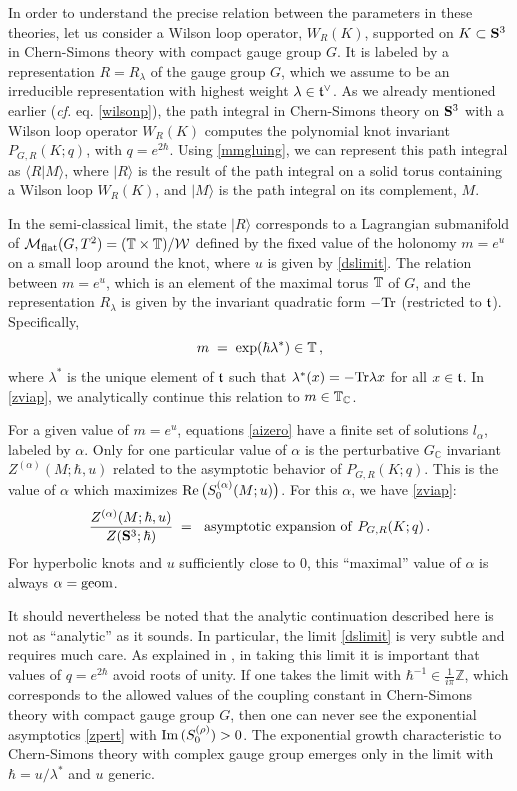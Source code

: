 \documentclass[hyper]{JHEP3}
\renewcommand{\Im}{{\rm Im}\,}
\renewcommand{\Re}{{\rm Re}\,}
\def\Tr{{\rm Tr}}
\def\CW {{\cal W}}
\def\TT{{\Bbb{T}}}
\newcommand{\C}{{\mathbb{C}}}
\newcommand{\Z}{{\mathbb{Z}}}
\newcommand{\M}{{{\cal M}}_{{\rm flat}}}
\newcommand\be{\begin{equation}}
\newcommand\ee{\end{equation}}
\def\={\;=\;}
\begin{document}
In order to understand the precise relation between the parameters in these theories,
let us consider a Wilson loop operator, $W_R (K)$,
supported on $K \subset {\bf S}^3$ in Chern-Simons theory with compact gauge group $G$.
It is labeled by a representation $R = R_{\lambda}$ of the gauge group $G$,
which we assume to be an irreducible representation with highest weight $\lambda \in \frak t^{\vee}$.
As we already mentioned earlier ({\it cf.} eq. \eqref{wilsonp}), the path integral in
Chern-Simons theory on ${\bf S}^3$ with a Wilson loop operator $W_R (K)$
computes the polynomial knot invariant $P_{G,R} (K;q)$, with $q = e^{2 \hbar}$.
Using \eqref{mmgluing}, we can represent this path integral as
$\langle R \vert M \rangle$,
where $\vert R \rangle$ is the result of the path integral on a solid torus containing
a Wilson loop $W_R (K)$, and $\vert M \rangle$ is the path integral on its complement, $M$.

In the semi-classical limit, the state $\vert R \rangle$ corresponds to
a Lagrangian submanifold of $\M (G,T^2) = (\TT \times \TT) / \CW$
defined by the fixed value of the holonomy $m = e^u$
on a small loop around the knot, where $u$ is given by \eqref{dslimit}.
The relation between $m=e^u$, which is an element of the maximal torus $\TT$ of $G$,
and the representation $R_{\lambda}$ is given by the invariant quadratic form $- \Tr$
(restricted to $\frak t$). Specifically,
\be
m \= \exp (\hbar \lambda^*) \in \TT \,,
\ee
where $\lambda^*$ is the unique element of $\frak t$ such that
$\lambda^* (x) = - \Tr \lambda x$ for all $x \in \frak t$.
In \eqref{zviap}, we analytically continue this relation to $m \in \TT_{\C}$.


For a given value of $m=e^u$, equations \eqref{aizero}
have a finite set of solutions $l_{\alpha}$, labeled by $\alpha$.
Only for one particular value of $\alpha$ is
the perturbative $G_{\C}$ invariant $Z^{(\alpha)} (M;\hbar,u)$
related to the asymptotic behavior of $P_{G,R} (K;q)$.
This is the value of $\alpha$ which maximizes $\Re \big( S_0^{(\alpha)} (M; u) \big)$.
For this $\alpha$, we have \eqref{zviap}:
\be
\frac{Z^{(\alpha)} (M;\hbar,u)}{Z({\bf S}^3;\hbar)}
\= {\rm ~asymptotic~expansion~of~} P_{G,R} (K;q)\,.
\label{zuviap}
\ee
For hyperbolic knots and $u$ sufficiently close to 0,
this ``maximal'' value of $\alpha$ is always $\alpha = {\rm geom}$.


It should nevertheless be noted that the analytic continuation described here is not as ``analytic'' as it sounds. In particular, the limit \eqref{dslimit} is very subtle and requires much care.
As explained in \cite{gukov-2003}, in taking this limit it is important that values of $q=e^{2\hbar}$ avoid roots of unity. If one takes the limit with $\hbar^{-1}\in\frac{1}{i\pi}\Z$, which corresponds to the allowed values of the coupling constant in Chern-Simons theory with compact gauge group $G$, then one can never see the exponential asymptotics \eqref{zpert} with $\Im (S_0^{(\rho)} ) >0$. The exponential growth characteristic to Chern-Simons theory with complex gauge group emerges only in the limit with $\hbar = u/\lambda^*$ and $u$ generic.
\end{document}
